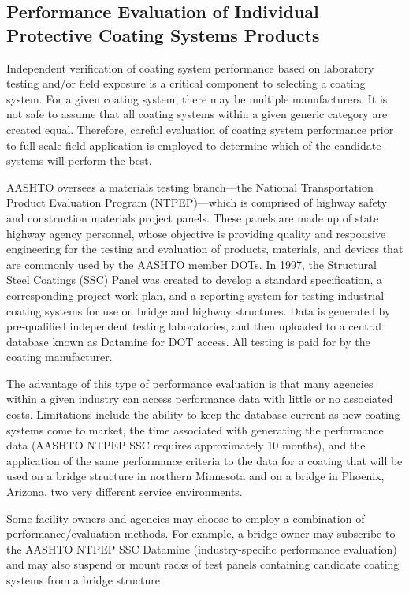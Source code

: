 \subsection{Performance Evaluation of Individual Protective Coating Systems Products}
Independent verification of coating system performance based on laboratory testing and/or field exposure is a
critical component to selecting a coating system. For a given coating system, there may be multiple manufacturers. It
is not safe to assume that all coating systems within a given generic category are created equal. Therefore, careful
evaluation of coating system performance prior to full-scale field application is employed to determine which of the
candidate systems will perform the best.

AASHTO oversees a materials testing branch—the National Transportation Product Evaluation Program
(NTPEP)—which is comprised of highway safety and construction materials project panels. These panels are made
up of state highway agency personnel, whose objective is providing quality and responsive engineering for the testing
and evaluation of products, materials, and devices that are commonly used by the AASHTO member DOTs. In 1997,
the Structural Steel Coatings (SSC) Panel was created to develop a standard specification, a corresponding project
work plan, and a reporting system for testing industrial coating systems for use on bridge and highway structures. Data is generated by pre-qualified independent testing laboratories, and then uploaded to a central database known as
Datamine for DOT access. All testing is paid for by the coating manufacturer.

The advantage of this type of performance evaluation is that many agencies within a given industry can access
performance data with little or no associated costs. Limitations include the ability to keep the database current as new
coating systems come to market, the time associated with generating the performance data (AASHTO NTPEP SSC
requires approximately 10 months), and the application of the same performance criteria to the data for a coating that
will be used on a bridge structure in northern Minnesota and on a bridge in Phoenix, Arizona, two very different
service environments.

Some facility owners and agencies may choose to employ a combination of performance/evaluation methods. For
example, a bridge owner may subscribe to the AASHTO NTPEP SSC Datamine (industry-specific performance
evaluation) and may also suspend or mount racks of test panels containing candidate coating systems from a bridge
structure